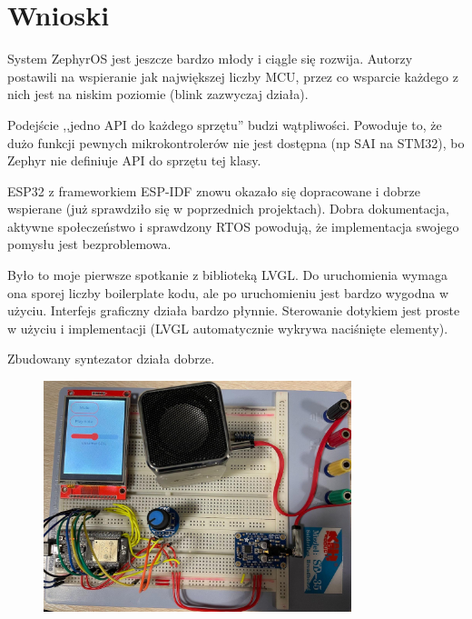 \documentclass[12pt,a4paper,openright,dvipsnames]{mwart}
\begin{document}
\section{Wnioski}

System ZephyrOS jest jeszcze bardzo młody i ciągle się rozwija.
Autorzy postawili na wspieranie jak największej liczby MCU,
przez co wsparcie każdego z nich jest na niskim poziomie
(blink zazwyczaj działa).

Podejście ,,jedno API do każdego sprzętu'' budzi wątpliwości.
Powoduje to, że dużo funkcji pewnych mikrokontrolerów nie jest
dostępna (np SAI na STM32), bo Zephyr nie definiuje API do
sprzętu tej klasy.

ESP32 z frameworkiem ESP-IDF znowu okazało się dopracowane
i dobrze wspierane (już sprawdziło się w poprzednich projektach).
Dobra dokumentacja, aktywne społeczeństwo i sprawdzony RTOS
powodują, że implementacja swojego pomysłu jest bezproblemowa.

Było to moje pierwsze spotkanie z biblioteką LVGL.
Do uruchomienia wymaga ona sporej liczby boilerplate
kodu, ale po uruchomieniu jest bardzo wygodna w użyciu.
Interfejs graficzny działa bardzo płynnie.
Sterowanie dotykiem jest proste w użyciu i implementacji
(LVGL automatycznie wykrywa naciśnięte elementy).

Zbudowany syntezator działa dobrze.

\begin{figure}[h]
    \centering
    \includegraphics[width=0.8\textwidth]{synth}
\end{figure}
\end{document}
